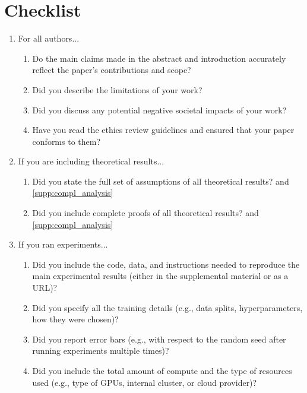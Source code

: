 \documentclass{article}
\begin{document}
\newpage
\section*{Checklist}
\begin{enumerate}

\item For all authors...
\begin{enumerate}
  \item Do the main claims made in the abstract and introduction accurately reflect the paper's contributions and scope?
    \answerYes{}
  \item Did you describe the limitations of your work?
  \item Did you discuss any potential negative societal impacts of your work?
    \answerNA{}
  \item Have you read the ethics review guidelines and ensured that your paper conforms to them?
    \answerYes{}
\end{enumerate}

\item If you are including theoretical results...
\begin{enumerate}
  \item Did you state the full set of assumptions of all theoretical results?
     and \ref{supp:compl_analysis}
	\item Did you include complete proofs of all theoretical results?
     and \ref{supp:compl_analysis}
\end{enumerate}

\item If you ran experiments...
\begin{enumerate}
  \item Did you include the code, data, and instructions needed to reproduce the main experimental results (either in the supplemental material or as a URL)?
  \item Did you specify all the training details (e.g., data splits, hyperparameters, how they were chosen)?
	\item Did you report error bars (e.g., with respect to the random seed after running experiments multiple times)?
	\item Did you include the total amount of compute and the type of resources used (e.g., type of GPUs, internal cluster, or cloud provider)?
\end{enumerate}


\end{enumerate}
\end{document}
